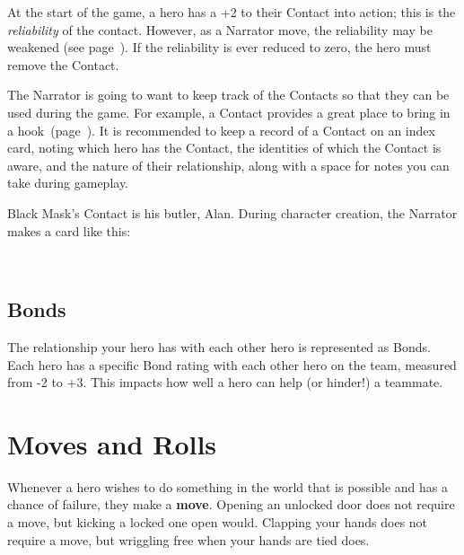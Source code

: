 \documentclass[letterpaper]{report}
\begin{document}
At the start of the game, a hero has a +2 to  their
Contact into action; this is the \textit{reliability} of the contact.
However, as a Narrator move, the reliability may be weakened (see
page~\pageref{move:change-reliability}). If the reliability is ever
reduced to zero, the hero must remove the Contact.

The Narrator is going to want to keep track of the Contacts
so that they can be used during the game. For example, a Contact
provides a great place to bring in a hook~(page~\pageref{sec:hook}).
It is recommended to keep a record of a Contact on an index card,
noting which hero has the Contact, the identities of which the
Contact is aware, and the nature of their relationship, along with
a space for notes you can take during gameplay.

\begin{example}
  Black Mask's Contact is his butler, Alan. During character
  creation, the Narrator makes a card like this:

  \begin{centering}
  \\
\end{centering}
\end{example}


\subsection*{Bonds}
The relationship your hero has with each other hero is
represented as Bonds. Each hero has a specific Bond rating with
each other hero on the team, measured from -2 to +3. This impacts
how well a hero can help (or hinder!) a teammate.

\section{Moves and Rolls}
Whenever a hero wishes to do something in the world that
is possible and has a chance of failure, they make a \textbf{move}.
Opening an unlocked door does not require a move, but kicking a locked
one open would. Clapping your hands does not require a move, but
wriggling free when your hands are tied does.
\end{document}

